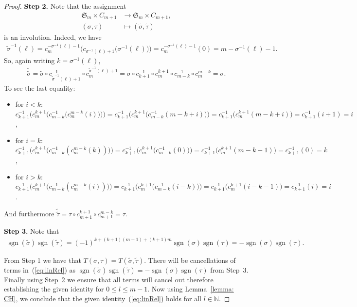 \documentclass[10pt,a4paper]{amsart}
\numberwithin{equation}{section}
\DeclareMathOperator{\sgn}{sgn}
\begin{document}
\begin{proof}
    {\bf Step 2.}
	Note that the assignment
	\begin{align*}
	\mathfrak{S}_m \times C_{m+1} & \to \mathfrak{S}_m \times C_{m+1}, \\
	(\sigma,\tau) & \mapsto (\tilde{\sigma}, \tilde{\tau})
	\end{align*}
	is an involution. Indeed,
	we have
	\begin{gather*}
		\tilde{\sigma}^{-1}(\ell) = c_m^{-\sigma^{-1}(\ell)-1}\big(c_{\sigma^{-1}(\ell)+1}\big(\sigma^{-1}(\ell)\big)\big)
		= c_m^{-\sigma^{-1}(\ell)-1}(0)
		= m-\sigma^{-1}(\ell)-1.
	\end{gather*}
	So, again writing $k=\sigma^{-1}(\ell)$,
	\begin{gather*}
	\tilde{\tilde{\sigma}} = \tilde{\sigma} \circ c_{\tilde{\sigma}^{-1}(\ell)+1}^{-1} \circ c_{m}^{\tilde{\sigma}^{-1}(\ell)+1}
	=\sigma \circ c_{k+1}^{-1} \circ c_{m}^{k+1} \circ c_{m-k}^{-1} \circ c_{m}^{m-k}
	= \sigma.
	\end{gather*}
	To see the last equality:
	\begin{itemize}\itemsep=0pt
		\item for $i<k$: $c_{k+1}^{-1}\big(c_{m}^{k+1}\big(c_{m-k}^{-1}\big(c_{m}^{m-k}(i)\big)\big)\big) = c_{k+1}^{-1}\big(c_{m}^{k+1}\big(c_{m-k}^{-1}(m-k+i)\big)\big) =  c_{k+1}^{-1}\big(c_{m}^{k+1}(m-k+i)\big)=c_{k+1}^{-1}(i+1)=i$,
		\item for $i=k$: $c_{k+1}^{-1}\big(c_{m}^{k+1}\big(c_{m-k}^{-1}(c_{m}^{m-k}(k))\big)\big) = c_{k+1}^{-1}\big(c_{m}^{k+1}\big(c_{m-k}^{-1}(0)\big)\big) = c_{k+1}^{-1}\big(c_{m}^{k+1}(m-k-1)\big)=c_{k+1}^{-1}(0)=k$,
		\item for $i>k$: $c_{k+1}^{-1}\big(c_{m}^{k+1}\big(c_{m-k}^{-1}(c_{m}^{m-k}(i))\big)\big) = c_{k+1}^{-1}\big(c_{m}^{k+1}\big(c_{m-k}^{-1}(i-k)\big)\big) =  c_{k+1}^{-1}\big(c_{m}^{k+1}(i-k-1)\big)=c_{k+1}^{-1}(i)=i$.
	\end{itemize}
	And furthermore $\tilde{\tilde{\tau}} = \tau \circ c_{m+1}^{k+1} \circ c_{m+1}^{m-k} = \tau$.
	
	{\bf Step 3.} Note that
	\begin{gather*}
	\sgn(\tilde{\sigma})\sgn(\tilde{\tau})  = (-1)^{k+(k+1)(m-1)+(k+1)m}\sgn(\sigma)\sgn(\tau)
	 =-\sgn(\sigma)\sgn(\tau).
	\end{gather*}
	
	From Step 1 we have that $T(\sigma,\tau) = T(\tilde{\sigma},\tilde{\tau})$. There will be cancellations of terms in~(\ref{eq:linRel}) as  $\sgn(\tilde{\sigma})\sgn(\tilde{\tau}) = -\sgn(\sigma)\sgn(\tau)$ from Step~3. Finally using Step~2 we ensure that all terms will cancel out therefore establishing the given identity for $ 0 \leq l \leq m-1$. Now using Lemma~\ref{lemma: CH}, we conclude that the given identity~(\ref{eq:linRel}) holds for all $l \in \mathbb{N}$.
\end{proof}
\end{document}
